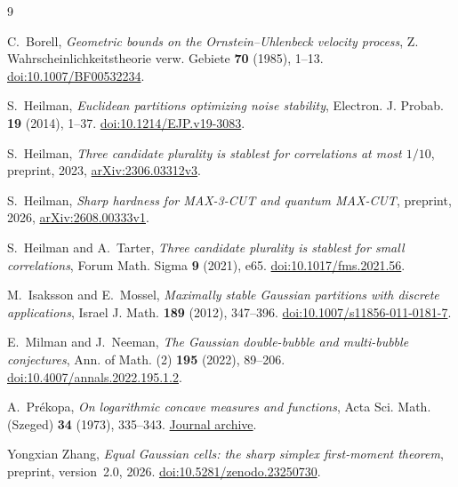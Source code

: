 \documentclass[11pt,reqno]{amsart}
\begin{document}
\begin{thebibliography}{9}
\raggedright
{}
C.~Borell, \emph{Geometric bounds on the Ornstein--Uhlenbeck velocity
process}, Z. Wahrscheinlichkeitstheorie verw. Gebiete \textbf{70}
(1985), 1--13.
\href{https://doi.org/10.1007/BF00532234}{doi:10.1007/BF00532234}.

S.~Heilman, \emph{Euclidean partitions optimizing noise stability},
Electron. J. Probab. \textbf{19} (2014), 1--37.
\href{https://doi.org/10.1214/EJP.v19-3083}{doi:10.1214/EJP.v19-3083}.

S.~Heilman, \emph{Three candidate plurality is stablest for correlations
at most $1/10$}, preprint, 2023,
\href{https://arxiv.org/abs/2306.03312v3}{arXiv:2306.03312v3}.

S.~Heilman, \emph{Sharp hardness for MAX-3-CUT and quantum MAX-CUT},
preprint, 2026,
\href{https://arxiv.org/abs/2608.00333v1}{arXiv:2608.00333v1}.

S.~Heilman and A.~Tarter,
\emph{Three candidate plurality is stablest for small correlations},
Forum Math. Sigma \textbf{9} (2021), e65.
\href{https://doi.org/10.1017/fms.2021.56}{doi:10.1017/fms.2021.56}.

M.~Isaksson and E.~Mossel, \emph{Maximally stable Gaussian partitions
with discrete applications}, Israel J. Math. \textbf{189} (2012), 347--396.
\href{https://doi.org/10.1007/s11856-011-0181-7}{doi:10.1007/s11856-011-0181-7}.

E.~Milman and J.~Neeman,
\emph{The Gaussian double-bubble and multi-bubble conjectures},
Ann. of Math. (2) \textbf{195} (2022), 89--206.
\href{https://doi.org/10.4007/annals.2022.195.1.2}{doi:10.4007/annals.2022.195.1.2}.

A.~Pr\'ekopa, \emph{On logarithmic concave measures and functions},
Acta Sci. Math. (Szeged) \textbf{34} (1973), 335--343.
\href{https://acta.bibl.u-szeged.hu/14411/}{Journal archive}.

Yongxian Zhang, \emph{Equal Gaussian cells: the sharp simplex first-moment
theorem}, preprint, version~2.0, 2026.
\href{https://doi.org/10.5281/zenodo.23250730}{doi:10.5281/zenodo.23250730}.
\end{thebibliography}
\end{document}
